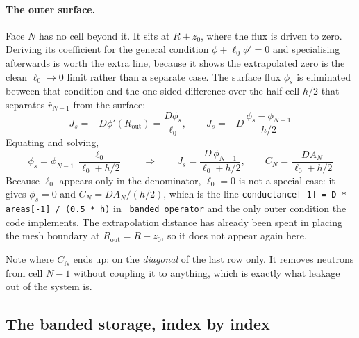 \documentclass[11pt]{article}
\begin{document}
{\paragraph{The outer surface.} Face $N$ has no cell beyond it. It sits at $R + z_0$, where the flux is driven to zero. Deriving its coefficient for the general condition $\phi + \ell_0 \phi' = 0$ and specialising afterwards is worth the extra line, because it shows the extrapolated zero is the clean $\ell_0 \to 0$ limit rather than a separate case. The surface flux $\phi_s$ is eliminated between that condition and the one-sided difference over the half cell $h/2$ that separates $\bar r_{N-1}$ from the surface:
\begin{equation}
    J_s = -D\phi'(R_{\text{out}}) = \frac{D\phi_s}{\ell_0},
    \qquad
    J_s = -D\,\frac{\phi_s - \phi_{N-1}}{h/2}
\end{equation}
Equating and solving,
\begin{equation}
    \phi_s = \phi_{N-1}\,\frac{\ell_0}{\ell_0 + h/2}
    \qquad\Longrightarrow\qquad
    J_s = \frac{D\,\phi_{N-1}}{\ell_0 + h/2},
    \qquad
    C_N = \frac{D A_N}{\ell_0 + h/2}
    \label{eq:CN}
\end{equation}
Because $\ell_0$ appears only in the denominator, $\ell_0 = 0$ is not a special case: it gives $\phi_s = 0$ and $C_N = D A_N/(h/2)$, which is the line \texttt{conductance[-1] = D * areas[-1] / (0.5 * h)} in \texttt{\_banded\_operator} and the only outer condition the code implements. The extrapolation distance has already been spent in placing the mesh boundary at $R_{\text{out}} = R + z_0$, so it does not appear again here.

Note where $C_N$ ends up: on the \emph{diagonal} of the last row only. It removes neutrons from cell $N-1$ without coupling it to anything, which is exactly what leakage out of the system is.

\subsection*{The banded storage, index by index}

}
\end{document}
